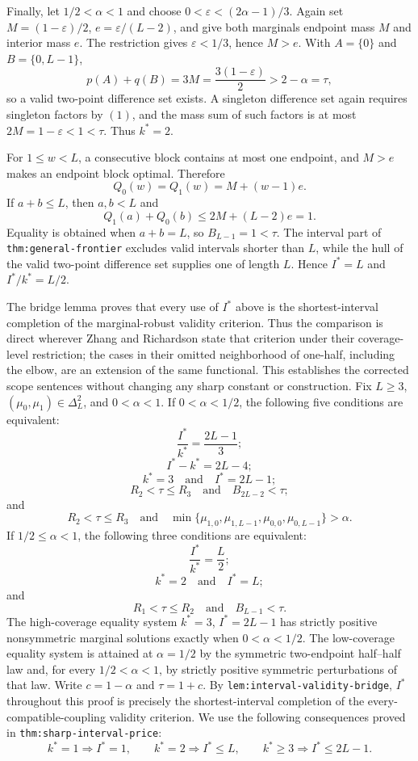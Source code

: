 Finally, let \(1/2<\alpha<1\) and choose \(0<\varepsilon<(2\alpha-1)/3\).  Again set \(M=(1-\varepsilon)/2\), \(e=\varepsilon/(L-2)\), and give both marginals endpoint mass \(M\) and interior mass \(e\).  The restriction gives \(\varepsilon<1/3\), hence \(M>e\).  With \(A=\{0\}\) and \(B=\{0,L-1\}\),
\[
p(A)+q(B)=3M=\frac{3(1-\varepsilon)}2>2-\alpha=\tau,
\]
so a valid two-point difference set exists.  A singleton difference set again requires singleton factors by \((1)\), and the mass sum of such factors is at most \(2M=1-\varepsilon<1<\tau\).  Thus \(k^*=2\).

For \(1\leq w<L\), a consecutive block contains at most one endpoint, and \(M>e\) makes an endpoint block optimal.  Therefore
\[
Q_0(w)=Q_1(w)=M+(w-1)e.
\]
If \(a+b\leq L\), then \(a,b<L\) and
\[
Q_1(a)+Q_0(b)
\leq2M+(L-2)e=1.
\]
Equality is obtained when \(a+b=L\), so \(B_{L-1}=1<\tau\).  The interval part of \texttt{thm:general-frontier} excludes valid intervals shorter than \(L\), while the hull of the valid two-point difference set supplies one of length \(L\).  Hence \(I^*=L\) and \(I^*/k^*=L/2\).

The bridge lemma proves that every use of \(I^*\) above is the shortest-interval completion of the marginal-robust validity criterion.  Thus the comparison is direct wherever Zhang and Richardson state that criterion under their coverage-level restriction; the cases in their omitted neighborhood of one-half, including the elbow, are an extension of the same functional.  This establishes the corrected scope sentences without changing any sharp constant or construction.
Fix \(L\geq3\), \((\mu_0,\mu_1)\in\Delta_L^2\), and \(0<\alpha<1\).  If \(0<\alpha<1/2\), the following five conditions are equivalent:
\[
\frac{I^*}{k^*}=\frac{2L-1}{3};
\]
\[
I^*-k^*=2L-4;
\]
\[
k^*=3\quad\text{and}\quad I^*=2L-1;
\]
\[
R_2<\tau\leq R_3\quad\text{and}\quad B_{2L-2}<\tau;
\]
and
\[
R_2<\tau\leq R_3
\quad\text{and}\quad
\min\{\mu_{1,0},\mu_{1,L-1},\mu_{0,0},\mu_{0,L-1}\}>\alpha.
\]
If \(1/2\leq\alpha<1\), the following three conditions are equivalent:
\[
\frac{I^*}{k^*}=\frac L2;
\]
\[
k^*=2\quad\text{and}\quad I^*=L;
\]
and
\[
R_1<\tau\leq R_2\quad\text{and}\quad B_{L-1}<\tau.
\]
The high-coverage equality system \(k^*=3\), \(I^*=2L-1\) has strictly positive nonsymmetric marginal solutions exactly when \(0<\alpha<1/2\).  The low-coverage equality system is attained at \(\alpha=1/2\) by the symmetric two-endpoint half--half law and, for every \(1/2<\alpha<1\), by strictly positive symmetric perturbations of that law.
Write \(c=1-\alpha\) and \(\tau=1+c\).  By \texttt{lem:interval-validity-bridge}, \(I^*\) throughout this proof is precisely the shortest-interval completion of the every-compatible-coupling validity criterion.  We use the following consequences proved in \texttt{thm:sharp-interval-price}:
\[
k^*=1\Longrightarrow I^*=1,
\qquad
k^*=2\Longrightarrow I^*\leq L,
\qquad
k^*\geq3\Longrightarrow I^*\leq2L-1.
\tag{1}
\]

